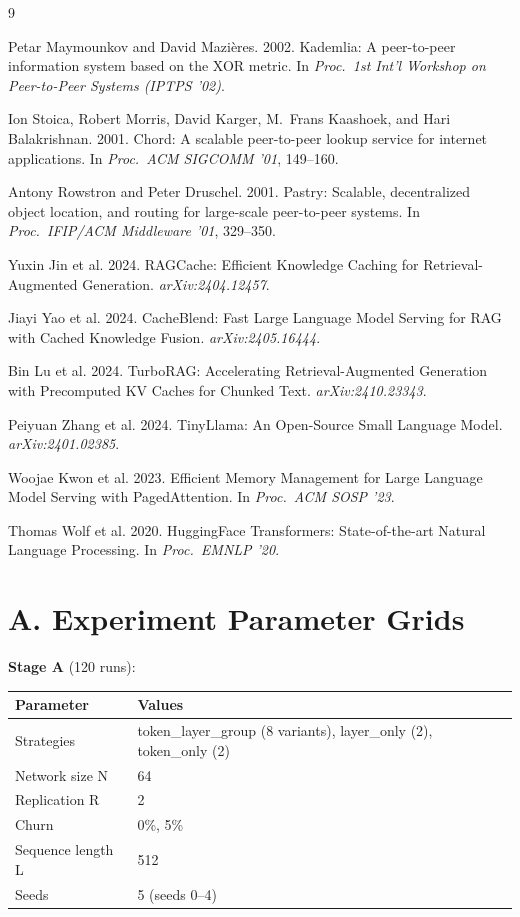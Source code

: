 \documentclass[11pt]{article}
\begin{document}
\begin{thebibliography}{9}

Petar Maymounkov and David Mazi\`{e}res. 2002.
Kademlia: A peer-to-peer information system based on the XOR metric.
In \textit{Proc.\ 1st Int'l Workshop on Peer-to-Peer Systems (IPTPS '02)}.

Ion Stoica, Robert Morris, David Karger, M.\ Frans Kaashoek, and Hari Balakrishnan. 2001.
Chord: A scalable peer-to-peer lookup service for internet applications.
In \textit{Proc.\ ACM SIGCOMM '01}, 149--160.

Antony Rowstron and Peter Druschel. 2001.
Pastry: Scalable, decentralized object location, and routing for large-scale peer-to-peer systems.
In \textit{Proc.\ IFIP/ACM Middleware '01}, 329--350.

Yuxin Jin et al. 2024.
RAGCache: Efficient Knowledge Caching for Retrieval-Augmented Generation.
\textit{arXiv:2404.12457}.

Jiayi Yao et al. 2024.
CacheBlend: Fast Large Language Model Serving for RAG with Cached Knowledge Fusion.
\textit{arXiv:2405.16444}.

Bin Lu et al. 2024.
TurboRAG: Accelerating Retrieval-Augmented Generation with Precomputed KV Caches for Chunked Text.
\textit{arXiv:2410.23343}.

Peiyuan Zhang et al. 2024.
TinyLlama: An Open-Source Small Language Model.
\textit{arXiv:2401.02385}.

Woojae Kwon et al. 2023.
Efficient Memory Management for Large Language Model Serving with PagedAttention.
In \textit{Proc.\ ACM SOSP '23}.

Thomas Wolf et al. 2020.
HuggingFace Transformers: State-of-the-art Natural Language Processing.
In \textit{Proc.\ EMNLP '20}.

\end{thebibliography}

\appendix
\section{A. Experiment Parameter Grids}

\textbf{Stage A} (120 runs):

\begin{longtable}[]{@{}ll@{}}
\toprule
Parameter & Values \\
\midrule
\endhead
\bottomrule
\endlastfoot
Strategies & token\_layer\_group (8 variants), layer\_only (2), token\_only (2) \\
Network size N & 64 \\
Replication R & 2 \\
Churn & 0\%, 5\% \\
Sequence length L & 512 \\
Seeds & 5 (seeds 0--4) \\
\end{longtable}
\end{document}
